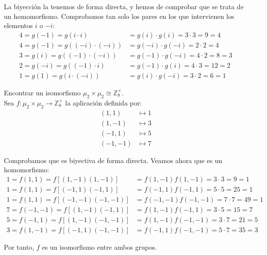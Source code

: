\begin{ejercicio}
\begin{enumerate}
        La biyección la tenemos de forma directa, y hemos de comprobar que se trata de un homomorfismo. Comprobamos tan solo los pares en los que intervienen los elementos $i$ o $-i$:
        \begin{align*}
            4=g(-1)=g(i\cdot i)&= g(i)\cdot g(i)=3\cdot 3=9=4\\
            4=g(-1)=g((-i)\cdot (-i))&= g(-i)\cdot g(-i)=2\cdot 2=4\\
            3=g(i)=g((-1)\cdot (-i))&= g(-1)\cdot g(-i)=4\cdot 2=8=3\\
            2=g(-i)=g((-1)\cdot i)&= g(-1)\cdot g(i)=4\cdot 3=12=2\\
            1=g(1)=g(i\cdot (-i))&= g(i)\cdot g(-i)=3\cdot 2=6=1
        \end{align*}
    \end{enumerate}
\end{ejercicio}

\begin{ejercicio}\label{ej:2.27}
    Encontrar un isomorfismo $\mu_2 \times \mu_2 \cong \mathbb{Z}^{\times}_8$.\\

    Sea $f:\mu_2 \times \mu_2 \to \mathbb{Z}^{\times}_8$ la aplicación definida por:
    \begin{align*}
        (1, 1) &\mapsto 1\\
        (1, -1) &\mapsto 3\\
        (-1, 1) &\mapsto 5\\
        (-1, -1) &\mapsto 7
    \end{align*}

    Comprobamos que es biyectiva de forma directa. Veamos ahora que es un homomorfismo:
    \begin{align*}
        1=f(1,1)=f[(1,-1)(1,-1)]&= f(1,-1)f(1,-1)=3\cdot 3=9=1\\
        1=f(1,1)=f[(-1,1)(-1,1)]&= f(-1,1)f(-1,1)=5\cdot 5=25=1\\
        1=f(1,1)=f[(-1,-1)(-1,-1)]&= f(-1,-1)f(-1,-1)=7\cdot 7=49=1\\
        7=f(-1,-1)=f[(1,-1)(-1,1)]&= f(1,-1)f(-1,1)=3\cdot 5=15=7\\
        5=f(-1,1)=f[(1,-1)(-1,-1)]&= f(1,-1)f(-1,-1)=3\cdot 7=21=5\\
        3=f(1,-1)=f[(-1,1)(-1,-1)]&= f(-1,1)f(-1,-1)=5\cdot 7=35=3
    \end{align*}

    Por tanto, $f$ es un isomorfismo entre ambos grupos.
\end{ejercicio}

